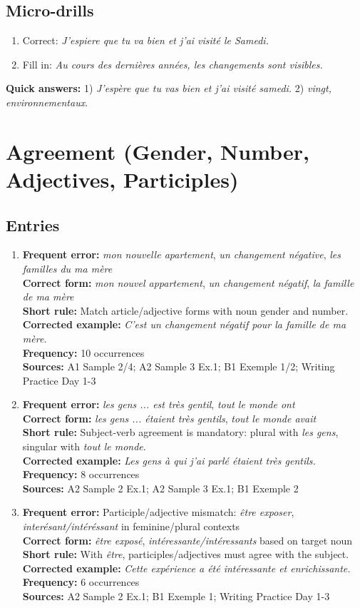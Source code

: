 \documentclass{article}
\newcommand{\mistakeentry}[6]{
\item \textbf{Frequent error:} #1\\
\textbf{Correct form:} #2\\
\textbf{Short rule:} #3\\
\textbf{Corrected example:} #4\\
\textbf{Frequency:} #5\\
\textbf{Sources:} #6
}
\begin{document}
\subsection*{Micro-drills}
\begin{enumerate}
    \item Correct: \textit{J'espiere que tu va bien et j'ai visité le Samedi.}
    \item Fill in: \textit{Au cours des \underline{\hspace{1cm}} dernières années, les changements \underline{\hspace{2cm}} sont visibles.}
\end{enumerate}
\textbf{Quick answers:} 1) \textit{J'espère que tu vas bien et j'ai visité samedi.} 2) \textit{vingt, environnementaux}.

\section{Agreement (Gender, Number, Adjectives, Participles)}
\subsection*{Entries}
\begin{enumerate}
    \mistakeentry
    {\textit{mon nouvelle apartement}, \textit{un changement négative}, \textit{les familles du ma mère}}
    {\textit{mon nouvel appartement}, \textit{un changement négatif}, \textit{la famille de ma mère}}
    {Match article/adjective forms with noun gender and number.}
    {\textit{C'est un changement négatif pour la famille de ma mère.}}
    {10 occurrences}
    {A1 Sample 2/4; A2 Sample 3 Ex.1; B1 Exemple 1/2; Writing Practice Day 1-3}

    \mistakeentry
    {\textit{les gens ... est très gentil}, \textit{tout le monde ont}}
    {\textit{les gens ... étaient très gentils}, \textit{tout le monde avait}}
    {Subject-verb agreement is mandatory: plural with \textit{les gens}, singular with \textit{tout le monde}.}
    {\textit{Les gens à qui j'ai parlé étaient très gentils.}}
    {8 occurrences}
    {A2 Sample 2 Ex.1; A2 Sample 3 Ex.1; B1 Exemple 2}

    \mistakeentry
    {Participle/adjective mismatch: \textit{être exposer}, \textit{interésant/intéréssant} in feminine/plural contexts}
    {\textit{être exposé}, \textit{intéressante/intéressants} based on target noun}
    {With \textit{être}, participles/adjectives must agree with the subject.}
    {\textit{Cette expérience a été intéressante et enrichissante.}}
    {6 occurrences}
    {A2 Sample 2 Ex.1; B1 Exemple 1; Writing Practice Day 1-3}
\end{enumerate}
\end{document}
